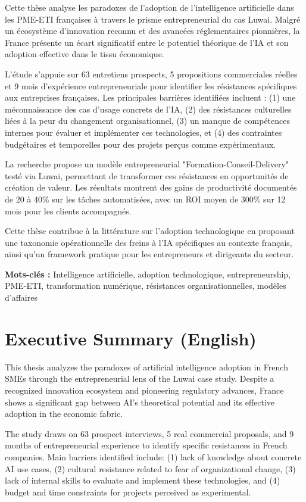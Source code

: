 \documentclass[12pt,a4paper]{report}
\begin{document}
Cette thèse analyse les paradoxes de l'adoption de l'intelligence artificielle dans les PME-ETI françaises à travers le prisme entrepreneurial du cas Luwai. Malgré un écosystème d'innovation reconnu et des avancées réglementaires pionnières, la France présente un écart significatif entre le potentiel théorique de l'IA et son adoption effective dans le tissu économique.

L'étude s'appuie sur 63 entretiens prospects, 5 propositions commerciales réelles et 9 mois d'expérience entrepreneuriale pour identifier les résistances spécifiques aux entreprises françaises. Les principales barrières identifiées incluent : (1) une méconnaissance des cas d'usage concrets de l'IA, (2) des résistances culturelles liées à la peur du changement organisationnel, (3) un manque de compétences internes pour évaluer et implémenter ces technologies, et (4) des contraintes budgétaires et temporelles pour des projets perçus comme expérimentaux.

La recherche propose un modèle entrepreneurial "Formation-Conseil-Delivery" testé via Luwai, permettant de transformer ces résistances en opportunités de création de valeur. Les résultats montrent des gains de productivité documentés de 20 à 40\% sur les tâches automatisées, avec un ROI moyen de 300\% sur 12 mois pour les clients accompagnés.

Cette thèse contribue à la littérature sur l'adoption technologique en proposant une taxonomie opérationnelle des freins à l'IA spécifiques au contexte français, ainsi qu'un framework pratique pour les entrepreneurs et dirigeants du secteur.

\textbf{Mots-clés :} Intelligence artificielle, adoption technologique, entrepreneurship, PME-ETI, transformation numérique, résistances organisationnelles, modèles d'affaires

\section*{Executive Summary (English)}

This thesis analyzes the paradoxes of artificial intelligence adoption in French SMEs through the entrepreneurial lens of the Luwai case study. Despite a recognized innovation ecosystem and pioneering regulatory advances, France shows a significant gap between AI's theoretical potential and its effective adoption in the economic fabric.

The study draws on 63 prospect interviews, 5 real commercial proposals, and 9 months of entrepreneurial experience to identify specific resistances in French companies. Main barriers identified include: (1) lack of knowledge about concrete AI use cases, (2) cultural resistance related to fear of organizational change, (3) lack of internal skills to evaluate and implement these technologies, and (4) budget and time constraints for projects perceived as experimental.
\end{document}
